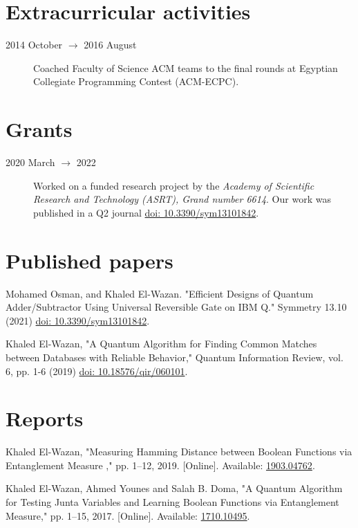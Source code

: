 \documentclass[margin,line]{resume}
\newcommand*{\doi}[1]{\href{http://dx.doi.org/#1}{doi: #1}}
\begin{document}
\begin{resume}
	\section{\mysidestyle Extracurricular activities}\vspace{1mm}
	\begin{description}
		\item[2014 October $\rightarrow$ 2016 August] Coached Faculty of Science ACM teams to the final rounds at Egyptian Collegiate Programming Contest (ACM-ECPC).

	\end{description}

	\section{\mysidestyle Grants}
	\begin{description}
		\item[2020 March $\rightarrow$ 2022] Worked on a funded research project by the \textit{Academy of Scientific Research and Technology (ASRT), Grand number 6614}. Our work was published in a Q2 journal \doi{10.3390/sym13101842}.
	\end{description}


	\section{ \mysidestyle Published papers}

	Mohamed Osman, and Khaled El-Wazan. "Efficient Designs of Quantum Adder/Subtractor Using Universal Reversible Gate on IBM Q." Symmetry 13.10 (2021) \doi{10.3390/sym13101842}.


	Khaled El-Wazan, "A Quantum Algorithm for Finding Common Matches between Databases with Reliable Behavior," Quantum Information Review, vol. 6, pp. 1-6 (2019) \doi{10.18576/qir/060101}.


	\section{\mysidestyle Reports}

	Khaled El-Wazan, "Measuring Hamming Distance between Boolean Functions via Entanglement Measure ,"  pp. 1--12, 2019.
		[Online]. Available: \href{http://arxiv.org/abs/1903.04762}{1903.04762}.



	Khaled El-Wazan, Ahmed Younes and Salah B. Doma, "A Quantum Algorithm for Testing Junta Variables and Learning Boolean Functions via Entanglement Measure,"  pp. 1--15, 2017.
		[Online]. Available: \href{http://arxiv.org/abs/1710.10495}{1710.10495}.




\end{resume}
\end{document}
